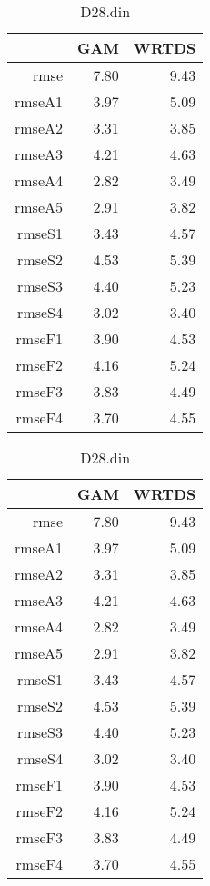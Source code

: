 \documentclass[12pt]{amsart}
\begin{document}

\begin{table}[H]
\centering
\begin{tabular}{rrr}
  \hline
 & GAM & WRTDS \\ 
  \hline
rmse & 7.80 & 9.43 \\ 
  rmseA1 & 3.97 & 5.09 \\ 
  rmseA2 & 3.31 & 3.85 \\ 
  rmseA3 & 4.21 & 4.63 \\ 
  rmseA4 & 2.82 & 3.49 \\ 
  rmseA5 & 2.91 & 3.82 \\ 
  rmseS1 & 3.43 & 4.57 \\ 
  rmseS2 & 4.53 & 5.39 \\ 
  rmseS3 & 4.40 & 5.23 \\ 
  rmseS4 & 3.02 & 3.40 \\ 
  rmseF1 & 3.90 & 4.53 \\ 
  rmseF2 & 4.16 & 5.24 \\ 
  rmseF3 & 3.83 & 4.49 \\ 
  rmseF4 & 3.70 & 4.55 \\ 
   \hline
\end{tabular}
\caption{D28.din}
\end{table}

\begin{table}[H]
\centering
\begin{tabular}{rrr}
  \hline
 & GAM & WRTDS \\ 
  \hline
rmse & 7.80 & 9.43 \\ 
  rmseA1 & 3.97 & 5.09 \\ 
  rmseA2 & 3.31 & 3.85 \\ 
  rmseA3 & 4.21 & 4.63 \\ 
  rmseA4 & 2.82 & 3.49 \\ 
  rmseA5 & 2.91 & 3.82 \\ 
  rmseS1 & 3.43 & 4.57 \\ 
  rmseS2 & 4.53 & 5.39 \\ 
  rmseS3 & 4.40 & 5.23 \\ 
  rmseS4 & 3.02 & 3.40 \\ 
  rmseF1 & 3.90 & 4.53 \\ 
  rmseF2 & 4.16 & 5.24 \\ 
  rmseF3 & 3.83 & 4.49 \\ 
  rmseF4 & 3.70 & 4.55 \\ 
   \hline
\end{tabular}
\caption{D28.din}
\end{table}
\end{document}
